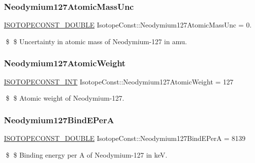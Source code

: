 \subsubsection{\texorpdfstring{Neodymium127\+Atomic\+Mass\+Unc}{Neodymium127AtomicMassUnc}}
{\footnotesize\ttfamily \mbox{\hyperlink{group___isotope_const-_macros_ga8f45a7272ce02c0b4c65c44636ed719a}{I\+S\+O\+T\+O\+P\+E\+C\+O\+N\+S\+T\+\_\+\+D\+O\+U\+B\+LE}} Isotope\+Const\+::\+Neodymium127\+Atomic\+Mass\+Unc = 0.}

\$ \$ Uncertainty in atomic mass of Neodymium-\/127 in amu. \mbox{\label{group___isotope_const-_neodymium-_nd127_gab79c54218b74d1caa17076f3e61d1e5f}} 
\subsubsection{\texorpdfstring{Neodymium127\+Atomic\+Weight}{Neodymium127AtomicWeight}}
{\footnotesize\ttfamily \mbox{\hyperlink{group___isotope_const-_macros_ga5f18360b3e99483a35c32d789e62621c}{I\+S\+O\+T\+O\+P\+E\+C\+O\+N\+S\+T\+\_\+\+I\+NT}} Isotope\+Const\+::\+Neodymium127\+Atomic\+Weight = 127}

\$ \$ Atomic weight of Neodymium-\/127. \mbox{\label{group___isotope_const-_neodymium-_nd127_ga80508c8627b01ee0f417111197de86fd}} 
\subsubsection{\texorpdfstring{Neodymium127\+Bind\+E\+PerA}{Neodymium127BindEPerA}}
{\footnotesize\ttfamily \mbox{\hyperlink{group___isotope_const-_macros_ga8f45a7272ce02c0b4c65c44636ed719a}{I\+S\+O\+T\+O\+P\+E\+C\+O\+N\+S\+T\+\_\+\+D\+O\+U\+B\+LE}} Isotope\+Const\+::\+Neodymium127\+Bind\+E\+PerA = 8139}

\$ \$ Binding energy per A of Neodymium-\/127 in keV. \mbox{\label{group___isotope_const-_neodymium-_nd127_gae0e3f3cb00a535b6f3fb305efa3defdb}} 
